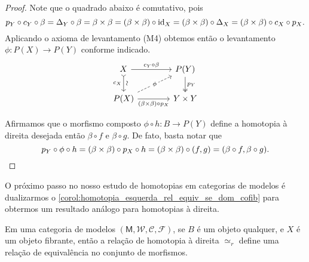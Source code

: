 \begin{proof}
  Note que o quadrado abaixo é comutativo, pois
  \begin{displaymath}
    p_{Y} \circ c_{Y} \circ \beta = \Delta_{Y} \circ \beta = \beta \times \beta = (\beta \times \beta) \circ \mathrm{id}_{X} = (\beta \times \beta) \circ \Delta_{X} = (\beta \times \beta) \circ c_{X} \circ p_{X}.
  \end{displaymath}
  Aplicando o axioma de levantamento (M4) obtemos então o levantamento $\phi: P(X) \to P(Y)$ conforme indicado.
  \begin{displaymath}
    \begin{tikzcd}[column sep=1.35cm]
      X
      \arrow[r, "c_{Y} \circ \beta"]
      \arrow[d, tail, "\sim" {sloped}, "c_{X}" {swap}]
      & P(Y)
      \arrow[d, two heads,"p_{Y}"]
      \\ P(X)
      \arrow[r, "(\beta \times \beta) \circ p_{X}" swap]
      \arrow[ru, dashed, "\phi" description]
      & Y \times Y
    \end{tikzcd}
  \end{displaymath}

  Afirmamos que o morfismo composto $\phi \circ h: B \to P(Y)$ define a homotopia à direita desejada então $\beta \circ f$ e $\beta \circ g$.
  De fato, basta notar que
  \begin{displaymath}
    p_{Y} \circ \phi \circ h = (\beta \times \beta) \circ p_{X} \circ h = (\beta \times \beta) \circ (f,g) = (\beta \circ f,\beta \circ g). \qedhere
  \end{displaymath}
\end{proof}

O próximo passo no nosso estudo de homotopias em categorias de modelos é dualizarmos o \cref{corol:homotopia_esquerda_rel_equiv_se_dom_cofib} para obtermos um resultado análogo para homotopias à direita.

\begin{corol}\label{corol:homotopia_direita_rel_equiv_se_cod_fib}
  Em uma categoria de modelos $(\mathsf{M},\mathcal{W},\mathcal{C},\mathcal{F})$, se $B$ é um objeto qualquer, e $X$ é um objeto fibrante, então a relação de homotopia à direita $\simeq_{r}$ define uma relação de equivalência no conjunto de morfismos.
\end{corol}

